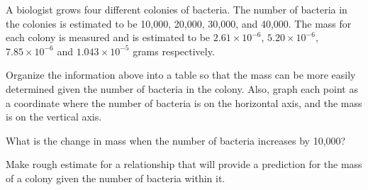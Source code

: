 
\begin{problem}
\item A biologist grows four different colonies of bacteria. The
  number of bacteria in the colonies is estimated to be 10,000,
  20,000, 30,000, and 40,000. The mass for each colony is measured and
  is estimated to be $2.61\times 10^{-6}$, $5.20\times 10^{-6}$,
  $7.85\times 10^{-6}$ and $1.043\times 10^{-5}$ grams respectively.

  Organize the information above into a table so that the mass can be
  more easily determined given the number of bacteria in the
  colony. Also, graph each point as a coordinate where the number of
  bacteria is on the horizontal axis, and the mass is on the vertical
  axis.

  \vfill

\item What is the change in mass when the number of bacteria increases
  by 10,000?

  \vfill

\item Make rough estimate for a relationship that will provide a
  prediction for the mass of a colony given the number of bacteria
  within it.

  \vfill


  \vspace{5em}


\end{problem}


